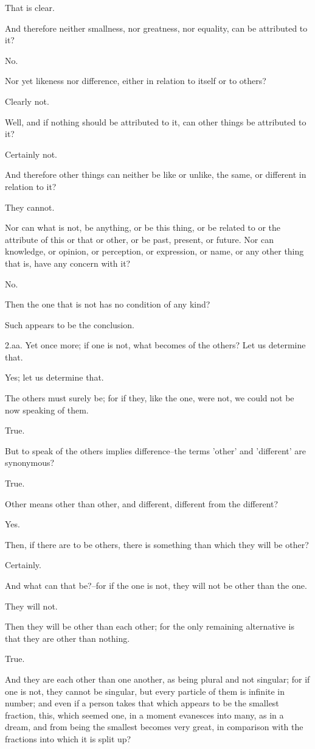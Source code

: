 That is clear.

And therefore neither smallness, nor greatness, nor equality, can be
attributed to it?

No.

Nor yet likeness nor difference, either in relation to itself or to
others?

Clearly not.

Well, and if nothing should be attributed to it, can other things be
attributed to it?

Certainly not.

And therefore other things can neither be like or unlike, the same, or
different in relation to it?

They cannot.

Nor can what is not, be anything, or be this thing, or be related to or
the attribute of this or that or other, or be past, present, or future.
Nor can knowledge, or opinion, or perception, or expression, or name, or
any other thing that is, have any concern with it?

No.

Then the one that is not has no condition of any kind?

Such appears to be the conclusion.

2.aa. Yet once more; if one is not, what becomes of the others? Let us
determine that.

Yes; let us determine that.

The others must surely be; for if they, like the one, were not, we could
not be now speaking of them.

True.

But to speak of the others implies difference--the terms 'other' and
'different' are synonymous?

True.

Other means other than other, and different, different from the
different?

Yes.

Then, if there are to be others, there is something than which they will
be other?

Certainly.

And what can that be?--for if the one is not, they will not be other
than the one.

They will not.

Then they will be other than each other; for the only remaining
alternative is that they are other than nothing.

True.

And they are each other than one another, as being plural and not
singular; for if one is not, they cannot be singular, but every particle
of them is infinite in number; and even if a person takes that which
appears to be the smallest fraction, this, which seemed one, in a moment
evanesces into many, as in a dream, and from being the smallest becomes
very great, in comparison with the fractions into which it is split up?

